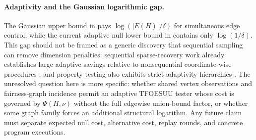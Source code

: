 \paragraph{Adaptivity and the Gaussian logarithmic gap.}
The Gaussian upper bound in  pays
$\log(|E(H)|/\delta)$ for simultaneous edge control, while the current adaptive
null lower bound in  contains only $\log(1/\delta)$.  This gap
should not be framed as a generic discovery that sequential sampling can remove
dimension penalties: sequential sparse-recovery work already establishes large
adaptive savings relative to nonsequential coordinate-wise procedures
\cite{MalloyNowak2014}, and property testing also exhibits strict adaptivity
hierarchies \cite{CanonneGur2018,Hurwitz2011}.  The unresolved question here is
more specific: whether shared vertex observations and fairness-graph incidence
permit an adaptive TFOESUU tester whose cost is governed by $\Psi(H,\nu)$
without the full edgewise union-bound factor, or whether some graph family forces
an additional structural logarithm.  Any future claim must separate expected
null cost, alternative cost, replay rounds, and concrete program executions.
